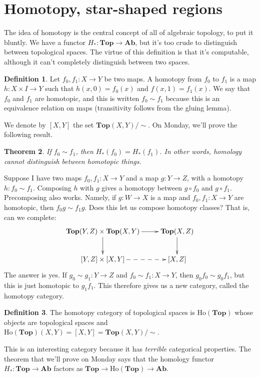 \documentclass{amsart}
\theoremstyle{theorem}
\newtheorem{theorem}{Theorem}[section]
\theoremstyle{definition}
\newtheorem{definition}[theorem]{Definition}
\begin{document}
\section{Homotopy, star-shaped regions}
The idea of homotopy is the central concept of all of algebraic topology, to put it bluntly. We have a functor $ H_\ast:\mathbf{Top}\to\mathbf{Ab}$, but it's too crude to distinguish between topological spaces. The virtue of this definition is that it's computable, although it can't completely distinguish between two spaces.
\begin{definition}
Let $f_0,f_1:X\to Y$ be two maps. A homotopy from $f_0$ to $f_1$ is a map $h:X\times I\to Y$ such that $h(x,0)=f_0(x)$ and $f(x,1)=f_1(x)$. We say that $f_0$ and $f_1$ are homotopic, and this is written $f_0\sim f_1$ because this is an equivalence relation on maps (transitivity follows from the gluing lemma).
\end{definition}
We denote by $[X,Y]$ the set $\mathbf{Top}(X,Y)/\sim$. On Monday, we'll prove the following result.
\begin{theorem}
If $f_0\sim f_1$, then $ H_\ast(f_0)= H_\ast(f_1)$. In other words, homology cannot distinguish between homotopic things.
\end{theorem}
Suppose I have two maps $f_0,f_1:X\to Y$ and a map $g:Y\to Z$, with a homotopy $h:f_0\sim f_1$. Composing $h$ with $g$ gives a homotopy between $g\circ f_0$ and $g\circ f_1$. Precomposing also works. Namely, if $g:W\to X$ is a map and $f_0,f_1:X\to Y$ are homotopic, then $f_0g\sim f_1g$. Does this let us compose homotopy classes? That is, can we complete:
\begin{equation*}
\xymatrix{\mathbf{Top}(Y,Z)\times\mathbf{Top}(X,Y)\ar[d]\ar[r] & \mathbf{Top}(X,Z)\ar[d]\\
[Y,Z]\times[X,Y]\ar@{-->}[r] & [X,Z]}
\end{equation*}
The answer is yes. If $g_0\sim g_1:Y\to Z$ and $f_0\sim f_1: X\to Y$, then $g_0f_0\sim g_0f_1$, but this is just homotopic to $g_1f_1$. This therefore gives us a new category, called the homotopy category.
\begin{definition}
The homotopy category of topological spaces is $\mathrm{Ho}(\mathbf{Top})$ whose objects are topological spaces and $\mathrm{Ho}(\mathbf{Top})(X,Y)=[X,Y]=\mathbf{Top}(X,Y)/\sim$.
\end{definition}
This is an interesting category because it has \textit{terrible} categorical properties. The theorem that we'll prove on Monday says that the homology functor $ H_\ast:\mathbf{Top}\to\mathbf{Ab}$ factors as $\mathbf{Top}\to\mathrm{Ho}(\mathbf{Top})\to\mathbf{Ab}$.
\end{document}
